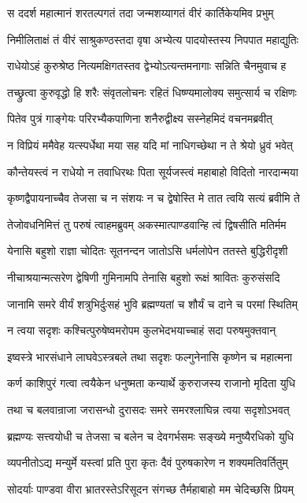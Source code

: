 \twolineshloka
{स ददर्श महात्मानं शरतल्पगतं तदा}
{जन्मशय्यागतं वीरं कार्तिकेयमिव प्रभुम्}


\twolineshloka
{निमीलिताक्षं तं वीरं साश्रुकण्ठस्तदा वृषा}
{अभ्येत्य पादयोस्तस्य निपपात महाद्युतिः}


\twolineshloka
{राधेयोऽहं कुरुश्रेष्ठ नित्यमक्षिगतस्तव}
{द्वेभ्योऽत्यन्तमनागाः सन्निति चैनमुवाच ह}


\twolineshloka
{तच्छ्रुत्वा कुरुवृद्धो हि शरैः संवृतलोचनः}
{रहितं धिष्ण्यमालोक्य समुत्सार्य च रक्षिणः}


\twolineshloka
{पितेव पुत्रं गाङ्गेयः परिरभ्यैकपाणिना}
{शनैरुद्वीक्ष्य सस्नेहमिदं वचनमब्रवीत्}


\twolineshloka
{न विप्रियं ममैवेह यत्स्पर्धेथा मया सह}
{यदि मां नाधिगच्छेथा न ते श्रेयो ध्रुवं भवेत्}


\twolineshloka
{कौन्तेयस्त्वं न राधेयो न तवाधिरथः पिता}
{सूर्यजस्त्वं महाबाहो विदितो नारदान्मया}


\twolineshloka
{कृष्णद्वैपायनाच्चैव तेजसा च न संशयः}
{न च द्वेषोस्ति मे तात त्वयि सत्यं ब्रवीमि ते}


\twolineshloka
{तेजोवधनिमित्तं तु परुषं त्वाहमब्रुवम्}
{अकस्मात्पाण्डवान्हि त्वं द्विषसीति मतिर्मम}


\twolineshloka
{येनासि बहुशो राज्ञा चोदितः सूतनन्दन}
{जातोऽसि धर्मलोपेन ततस्ते बुद्धिरीदृशी}


\twolineshloka
{नीचाश्रयान्मत्सरेण द्वेषिणी गुमिनामपि}
{तेनासि बहुशो रूक्षं श्रावितः कुरुसंसदि}


\twolineshloka
{जानामि समरे वीर्यं शत्रुभिर्दुःसहं भुवि}
{ब्रह्मण्यतां च शौर्यं च दाने च परमां स्थितिम्}


\twolineshloka
{न त्वया सदृशः कश्चित्पुरुषेष्वमरोपम}
{कुलभेदभयाच्चाहं सदा परुषमुक्तवान्}


\twolineshloka
{इष्वस्त्रे भारसंधाने लाघवेऽस्त्रबले तथा}
{सदृशः फल्गुनेनासि कृष्णेन च महात्मना}


\twolineshloka
{कर्ण काशिपुरं गत्वा त्वयैकेन धनुष्मता}
{कन्यार्थे कुरुराजस्य राजानो मृदिता युधि}


\twolineshloka
{तथा च बलवान्राजा जरासन्धो दुरासदः}
{समरे समरश्लाघिन्न त्वया सदृशोऽभवत्}


\twolineshloka
{ब्रह्मण्यः सत्त्वयोधी च तेजसा च बलेन च}
{देवगर्भसमः सङ्ख्ये मनुष्यैरधिको युधि}


\twolineshloka
{व्यपनीतोऽद्य मन्युर्मे यस्त्वां प्रति पुरा कृतः}
{दैवं पुरुषकारेण न शक्यमतिवर्तितुम्}


\twolineshloka
{सोदर्याः पाण्डवा वीरा भ्रातरस्तेऽरिसूदन}
{संगच्छ तैर्महाबाहो मम चेदिच्छसि प्रियम्}



